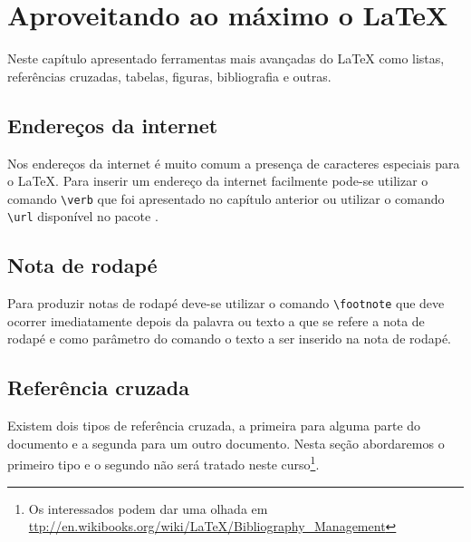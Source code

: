 % 
% 
% 
% 
% 
% 
%
%
\chapter{Aproveitando ao m\'{a}ximo o \LaTeX}
Neste capítulo apresentado ferramentas mais avan\c{c}adas do LaTeX  como listas, refer\^{e}ncias cruzadas, tabelas, figuras, bibliografia e outras.

\section{Endere\c{c}os da internet}
Nos endere\c{c}os da internet \'{e} muito comum a presen\c{c}a de caracteres especiais para o LaTeX. Para inserir um endere\c{c}o da internet facilmente pode-se utilizar o comando \lstinline!\verb! que foi apresentado no cap\'{i}tulo anterior ou utilizar o comando \lstinline!\url! dispon\'{i}vel no pacote .

\section{Nota de rodapé}
Para produzir notas de rodapé deve-se utilizar o comando \lstinline!\footnote! que deve ocorrer imediatamente depois da palavra ou texto a que se refere a nota de rodapé e como parâmetro do comando o texto a ser inserido na nota de rodapé.

\section{Referência cruzada} \label{sse:cross_reference}
Existem dois tipos de referência cruzada, a primeira para alguma parte do documento e a segunda para um outro documento. Nesta seção abordaremos o primeiro tipo e o segundo n\~{a}o ser\'{a} tratado neste curso\footnote{Os interessados podem dar uma olhada em \url{ttp://en.wikibooks.org/wiki/LaTeX/Bibliography_Management}}.

